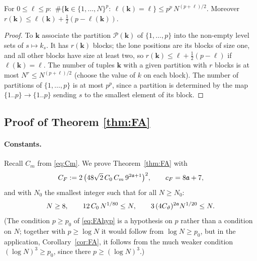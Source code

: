 \begin{lemma}\label{lem:FAcount}
For $0\le\ell\le p$: $\ \#\{\mathbf k\in\{1,\dots,N\}^p:\ \ell(\mathbf k)=\ell\}\le p^p\,N^{(p+\ell)/2}$. Moreover $r(\mathbf k)\le\ell(\mathbf k)+\frac12(p-\ell(\mathbf k))$.
\end{lemma}
\begin{proof}
To $\mathbf k$ associate the partition $\mathscr P(\mathbf k)$ of $\{1,\dots,p\}$ into the non-empty level sets of $s\mapsto k_s$. It has $r(\mathbf k)$ blocks; the lone positions are its blocks of size one, and all other blocks have size at least two, so $r(\mathbf k)\le\ell+\frac12(p-\ell)$ if $\ell(\mathbf k)=\ell$.
The number of tuples $\mathbf k$ with a given partition with $r$ blocks is at most $N^r\le N^{(p+\ell)/2}$ (choose the value of $k$ on each block). The number of partitions of $\{1,\dots,p\}$ is at most $p^p$, since a partition is determined by the map $\{1..p\}\to\{1..p\}$ sending $s$ to the smallest element of its block.
\end{proof}

\subsection{Proof of Theorem \ref{thm:FA}}\label{sec:FAproof}
\paragraph{Constants.} Recall $C_m$ from \eqref{eq:Cm}. We prove Theorem~\ref{thm:FA} with
\begin{equation}\label{eq:CF}
 C_F:=2\,\big(48\sqrt2\,C_0\,C_m\,9^{2\mathfrak{a}+1}\big)^2,\qquad c_F=8\mathfrak{a}+7,
\end{equation}
and with $N_0$ the smallest integer such that for all $N\ge N_0$:
\begin{equation}\label{eq:N0FA}
 N\ge8,\qquad12\,C_0\,N^{1/80}\le N,\qquad3\,(4C_\vartheta)^{2\mathfrak{a}}N^{1/20}\le N.
\end{equation}
(The condition $p\ge p_0$ of \eqref{eq:FAhyp} is a hypothesis on $p$ rather than a condition on $N$; together with $p\ge\log N$ it would follow from $\log N\ge p_0$, but
in the application, Corollary~\ref{cor:FA}, it follows from the much weaker condition $(\log N)^3\ge p_0$, since there $p\ge(\log N)^3$.)

